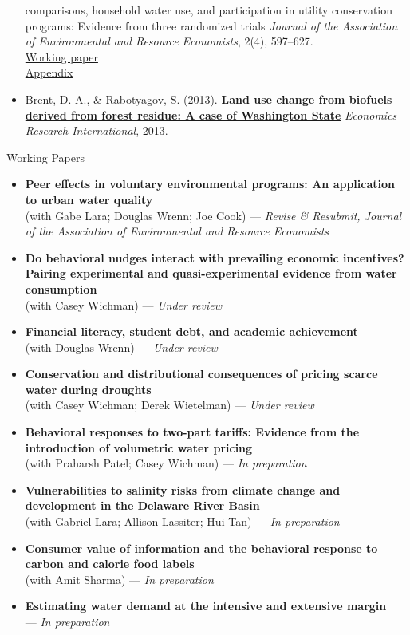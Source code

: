 \documentclass[
  11pt,
]{article}
\makeatletter
\renewcommand\subsection{
  \@startsection{subsection}{2}{0pt}
  {0.8ex}
  {0.3ex}
  {\sffamily\bfseries\large}
}
\makeatother
\begin{document}
\begin{itemize}
{{  comparisons, household water use, and participation in utility
  conservation programs: Evidence from three randomized trials}}
  \emph{Journal of the Association of Environmental and Resource
  Economists}, 2(4), 597--627.\\
  \href{assets/papers/brent_cook_olsen_social_comparisons_wp.pdf}{Working
  paper}\\
  \href{assets/papers/brent_cook_olsen_appendix.pdf}{Appendix}
\item
  Brent, D. A., \& Rabotyagov, S. (2013).
  \textbf{\href{https://www.hindawi.com/journals/econ/2013/435170/}{Land
  use change from biofuels derived from forest residue: A case of
  Washington State}} \emph{Economics Research International}, 2013.
\end{itemize}

\subsection{Working Papers}\label{working-papers}

\begin{itemize}
\item
  \textbf{Peer effects in voluntary environmental programs: An
  application to urban water quality}\\
  (with Gabe Lara; Douglas Wrenn; Joe Cook) --- \emph{Revise \&
  Resubmit, Journal of the Association of Environmental and Resource
  Economists}
\item
  \textbf{Do behavioral nudges interact with prevailing economic
  incentives? Pairing experimental and quasi-experimental evidence from
  water consumption}\\
  (with Casey Wichman) --- \emph{Under review}
\item
  \textbf{Financial literacy, student debt, and academic achievement}\\
  (with Douglas Wrenn) --- \emph{Under review}
\item
  \textbf{Conservation and distributional consequences of pricing scarce
  water during droughts}\\
  (with Casey Wichman; Derek Wietelman) --- \emph{Under review}
\item
  \textbf{Behavioral responses to two-part tariffs: Evidence from the
  introduction of volumetric water pricing}\\
  (with Praharsh Patel; Casey Wichman) --- \emph{In preparation}
\item
  \textbf{Vulnerabilities to salinity risks from climate change and
  development in the Delaware River Basin}\\
  (with Gabriel Lara; Allison Lassiter; Hui Tan) --- \emph{In
  preparation}
\item
  \textbf{Consumer value of information and the behavioral response to
  carbon and calorie food labels}\\
  (with Amit Sharma) --- \emph{In preparation}
\item
  \textbf{Estimating water demand at the intensive and extensive
  margin}\\
  --- \emph{In preparation}
\end{itemize}
\end{document}
